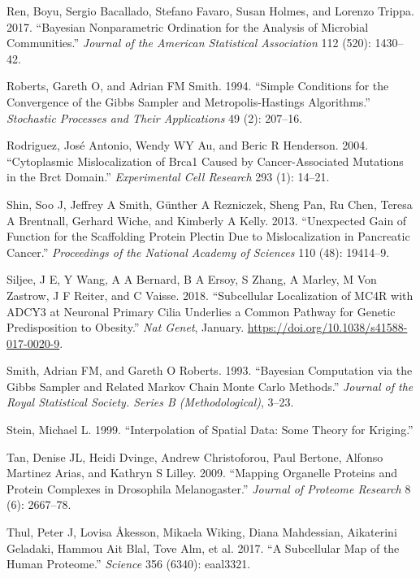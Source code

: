 \documentclass[
]{article}
\begin{document}
\leavevmode\hypertarget{ref-Ren:2017}{}%
Ren, Boyu, Sergio Bacallado, Stefano Favaro, Susan Holmes, and Lorenzo
Trippa. 2017. ``Bayesian Nonparametric Ordination for the Analysis of
Microbial Communities.'' \emph{Journal of the American Statistical
Association} 112 (520): 1430--42.

\leavevmode\hypertarget{ref-Roberts:1994}{}%
Roberts, Gareth O, and Adrian FM Smith. 1994. ``Simple Conditions for
the Convergence of the Gibbs Sampler and Metropolis-Hastings
Algorithms.'' \emph{Stochastic Processes and Their Applications} 49 (2):
207--16.

\leavevmode\hypertarget{ref-Rodriguez:2004}{}%
Rodriguez, José Antonio, Wendy WY Au, and Beric R Henderson. 2004.
``Cytoplasmic Mislocalization of Brca1 Caused by Cancer-Associated
Mutations in the Brct Domain.'' \emph{Experimental Cell Research} 293
(1): 14--21.

\leavevmode\hypertarget{ref-Shin:2013}{}%
Shin, Soo J, Jeffrey A Smith, Günther A Rezniczek, Sheng Pan, Ru Chen,
Teresa A Brentnall, Gerhard Wiche, and Kimberly A Kelly. 2013.
``Unexpected Gain of Function for the Scaffolding Protein Plectin Due to
Mislocalization in Pancreatic Cancer.'' \emph{Proceedings of the
National Academy of Sciences} 110 (48): 19414--9.

\leavevmode\hypertarget{ref-Siljee:2018}{}%
Siljee, J E, Y Wang, A A Bernard, B A Ersoy, S Zhang, A Marley, M Von
Zastrow, J F Reiter, and C Vaisse. 2018. ``Subcellular Localization of
MC4R with ADCY3 at Neuronal Primary Cilia Underlies a Common Pathway for
Genetic Predisposition to Obesity.'' \emph{Nat Genet}, January.
\url{https://doi.org/10.1038/s41588-017-0020-9}.

\leavevmode\hypertarget{ref-Smith:1993}{}%
Smith, Adrian FM, and Gareth O Roberts. 1993. ``Bayesian Computation via
the Gibbs Sampler and Related Markov Chain Monte Carlo Methods.''
\emph{Journal of the Royal Statistical Society. Series B
(Methodological)}, 3--23.

\leavevmode\hypertarget{ref-Stein:1999}{}%
Stein, Michael L. 1999. ``Interpolation of Spatial Data: Some Theory for
Kriging.''

\leavevmode\hypertarget{ref-Tan:2009}{}%
Tan, Denise JL, Heidi Dvinge, Andrew Christoforou, Paul Bertone, Alfonso
Martinez Arias, and Kathryn S Lilley. 2009. ``Mapping Organelle Proteins
and Protein Complexes in Drosophila Melanogaster.'' \emph{Journal of
Proteome Research} 8 (6): 2667--78.

\leavevmode\hypertarget{ref-Thul:2017}{}%
Thul, Peter J, Lovisa Åkesson, Mikaela Wiking, Diana Mahdessian,
Aikaterini Geladaki, Hammou Ait Blal, Tove Alm, et al. 2017. ``A
Subcellular Map of the Human Proteome.'' \emph{Science} 356 (6340):
eaal3321.
\end{document}
